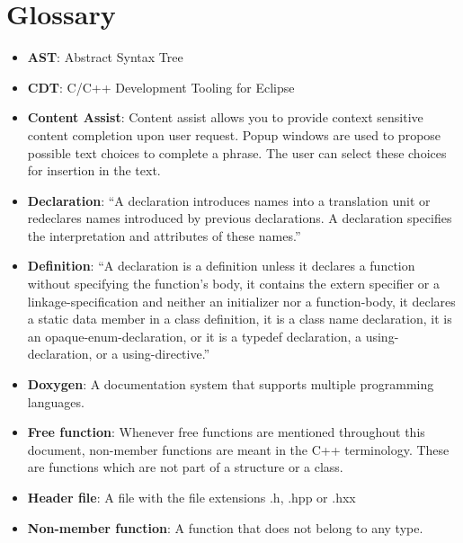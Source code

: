 \chapter{Glossary}
\thispagestyle{fancy}

\begin{itemize}
\item \textbf{AST}: Abstract Syntax Tree

\item \textbf{CDT}: C/C++ Development Tooling for Eclipse

\item \textbf{Content Assist}: Content assist allows you to provide context 
sensitive content completion upon user request. Popup windows are used to 
propose possible text choices to complete a phrase. The user can select these 
choices for insertion in the text. \cite{assist}

\item \textbf{Declaration}: ``A declaration introduces names into a translation 
unit or redeclares names introduced by previous declarations. A declaration 
specifies the interpretation and attributes of these names.''\cite{IsoCpp}

\item \textbf{Definition}: ``A declaration is a definition unless it declares a 
function without specifying the function’s body, it contains the extern 
specifier or a linkage-specification and neither an initializer nor a 
function-body, it declares a static data member in a class definition, it is a 
class name declaration, it is an opaque-enum-declaration, or it is a typedef 
declaration, a using-declaration, or a using-directive.''\cite{IsoCpp}

\item \textbf{Doxygen}: A documentation system that supports multiple 
programming languages.

\item \textbf{Free function}: Whenever free functions are mentioned throughout
this document, non-member functions are meant in the C++ terminology. These are
functions which are not part of a structure or a class.

\item \textbf{Header file}: A file with the file extensions .h, .hpp or .hxx

\item \textbf{Non-member function}: A function that does not belong to any type.


\end{itemize}
